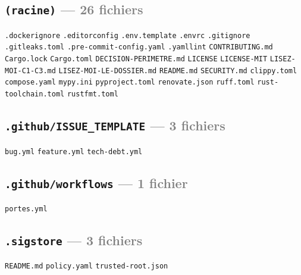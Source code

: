 \documentclass[10pt]{report}
\newcommand{\code}[1]{\texttt{\small #1}}
\begin{document}
\subsection*{\code{(racine)} \normalfont\textcolor{grey}{--- 26 fichiers}}
\begin{sloppypar}\footnotesize\raggedright
\code{.dockerignore} \;\textbullet\; \code{.editorconfig} \;\textbullet\; \code{.env.template} \;\textbullet\; \code{.envrc} \;\textbullet\; \code{.gitignore} \;\textbullet\; \code{.gitleaks.toml} \;\textbullet\; \code{.pre-commit-config.yaml} \;\textbullet\; \code{.yamllint} \;\textbullet\; \code{CONTRIBUTING.md} \;\textbullet\; \code{Cargo.lock} \;\textbullet\; \code{Cargo.toml} \;\textbullet\; \code{DECISION-PERIMETRE.md} \;\textbullet\; \code{LICENSE} \;\textbullet\; \code{LICENSE-MIT} \;\textbullet\; \code{LISEZ-MOI-C1-C3.md} \;\textbullet\; \code{LISEZ-MOI-LE-DOSSIER.md} \;\textbullet\; \code{README.md} \;\textbullet\; \code{SECURITY.md} \;\textbullet\; \code{clippy.toml} \;\textbullet\; \code{compose.yaml} \;\textbullet\; \code{mypy.ini} \;\textbullet\; \code{pyproject.toml} \;\textbullet\; \code{renovate.json} \;\textbullet\; \code{ruff.toml} \;\textbullet\; \code{rust-toolchain.toml} \;\textbullet\; \code{rustfmt.toml}
\end{sloppypar}

\subsection*{\code{.github/ISSUE\_TEMPLATE} \normalfont\textcolor{grey}{--- 3 fichiers}}
\begin{sloppypar}\footnotesize\raggedright
\code{bug.yml} \;\textbullet\; \code{feature.yml} \;\textbullet\; \code{tech-debt.yml}
\end{sloppypar}

\subsection*{\code{.github/workflows} \normalfont\textcolor{grey}{--- 1 fichier}}
\begin{sloppypar}\footnotesize\raggedright
\code{portes.yml}
\end{sloppypar}

\subsection*{\code{.sigstore} \normalfont\textcolor{grey}{--- 3 fichiers}}
\begin{sloppypar}\footnotesize\raggedright
\code{README.md} \;\textbullet\; \code{policy.yaml} \;\textbullet\; \code{trusted-root.json}
\end{sloppypar}
\end{document}
